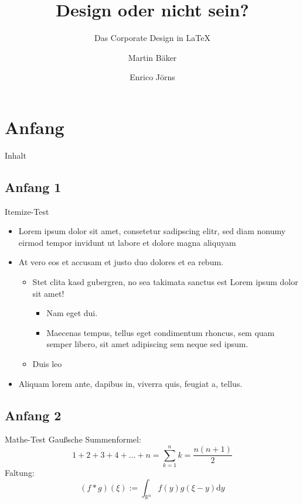 \documentclass[fleqn,10pt,t,tocinheader,widetoc,blue]{beamer}
\title{Design oder nicht sein?}
\subtitle{Das Corporate Design in  LaTeX}
\author{Martin Bäker\and Enrico Jörns}
\begin{document}
\begin{frame}[plain]
\titlepage
\end{frame}

\section{Anfang}

\begin{frame}{Inhalt}
\tableofcontents
\end{frame}

\subsection{Anfang 1}

\begin{frame}{Itemize-Test}
  \begin{itemize}
    \item Lorem ipsum dolor sit amet, consetetur sadipscing elitr, sed diam
      nonumy eirmod tempor invidunt ut labore et dolore magna aliquyam
    \item At vero eos et accusam et justo duo dolores et ea rebum.
      \begin{itemize}
        \item Stet clita kasd gubergren, no sea takimata sanctus est Lorem ipsum
          dolor sit amet!
          \begin{itemize}
            \item Nam eget dui.
            \item Maecenas tempus, tellus eget condimentum rhoncus, sem quam
              semper libero, sit amet adipiscing sem neque sed ipsum.
          \end{itemize}
        \item Duis leo
      \end{itemize}
    \item Aliquam lorem ante, dapibus in, viverra quis, feugiat a, tellus. 
  \end{itemize}
\end{frame}

\subsection{Anfang 2}

\begin{frame}{Mathe-Test}
  Gaußsche Summenformel:
  \[1 + 2 + 3 + 4 + \ldots + n = \sum_{k=1}^n k = \frac{n(n+1)}{2}\]
  Faltung:
  \[(f*g)(\xi) := \int_{\mathbb{R}^n} f(y)g(\xi-y)\mathrm{d}y\]
\end{frame}
\end{document}
